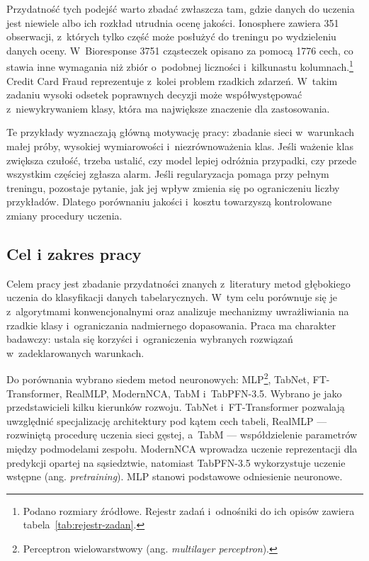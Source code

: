 Przydatność tych podejść warto zbadać zwłaszcza tam, gdzie danych do uczenia jest niewiele albo ich rozkład utrudnia ocenę jakości. Ionosphere zawiera 351 obserwacji, z~których tylko część może posłużyć do treningu po wydzieleniu danych oceny. W~Bioresponse 3751 cząsteczek opisano za pomocą 1776 cech, co stawia inne wymagania niż zbiór o~podobnej liczności i~kilkunastu kolumnach.\footnote{Podano rozmiary źródłowe. Rejestr zadań i~odnośniki do ich opisów zawiera tabela~\ref{tab:rejestr-zadan}.} Credit Card Fraud reprezentuje z~kolei problem rzadkich zdarzeń. W~takim zadaniu wysoki odsetek poprawnych decyzji może współwystępować z~niewykrywaniem klasy, która ma największe znaczenie dla zastosowania.

Te przykłady wyznaczają główną motywację pracy: zbadanie sieci w~warunkach małej próby, wysokiej wymiarowości i~niezrównoważenia klas. Jeśli ważenie klas zwiększa czułość, trzeba ustalić, czy model lepiej odróżnia przypadki, czy przede wszystkim częściej zgłasza alarm. Jeśli regularyzacja pomaga przy pełnym treningu, pozostaje pytanie, jak jej wpływ zmienia się po ograniczeniu liczby przykładów. Dlatego porównaniu jakości i~kosztu towarzyszą kontrolowane zmiany procedury uczenia.

\subsection{Cel i zakres pracy}
\label{sec:cel-zakres}

Celem pracy jest zbadanie przydatności znanych z~literatury metod głębokiego uczenia do klasyfikacji danych tabelarycznych. W~tym celu porównuje się je z~algorytmami konwencjonalnymi oraz analizuje mechanizmy uwrażliwiania na rzadkie klasy i~ograniczania nadmiernego dopasowania. Praca ma charakter badawczy: ustala się korzyści i~ograniczenia wybranych rozwiązań w~zadeklarowanych warunkach.

Do porównania wybrano siedem metod neuronowych: MLP\footnote{Perceptron wielowarstwowy (ang. \textit{multilayer perceptron}).}, TabNet, FT-Transformer, RealMLP, ModernNCA, TabM i~TabPFN-3.5. Wybrano je jako przedstawicieli kilku kierunków rozwoju. TabNet i~FT-Transformer pozwalają uwzględnić specjalizację architektury pod kątem cech tabeli, RealMLP --- rozwiniętą procedurę uczenia sieci gęstej, a~TabM --- współdzielenie parametrów między podmodelami zespołu. ModernNCA wprowadza uczenie reprezentacji dla predykcji opartej na sąsiedztwie, natomiast TabPFN-3.5 wykorzystuje uczenie wstępne (ang. \textit{pretraining}). MLP stanowi podstawowe odniesienie neuronowe.

